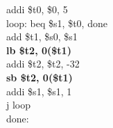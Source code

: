 \documentclass[../main.tex]{subfiles}
\begin{document}
{    \hspace*{0cm} \hspace*{0cm} \hspace*{0cm} \hspace*{0cm} \hspace*{0cm} \hspace*{0cm} \hspace*{0cm} addi \$t0, \$0, 5 \\
    loop:\hspace*{2.1mm} \hspace*{0cm}beq \$s1, \$t0, done \\
    \hspace*{0cm} \hspace*{0cm} \hspace*{0cm} \hspace*{0cm} \hspace*{0cm} \hspace*{0cm} \hspace*{0cm} add \$t1, \$s0, \$s1 \\
    \hspace*{0cm} \hspace*{0cm} \hspace*{0cm} \hspace*{0cm} \hspace*{0cm} \hspace*{0cm} \hspace*{0cm} \textbf{lb \$t2, 0(\$t1)} \\
    \hspace*{0cm} \hspace*{0cm} \hspace*{0cm} \hspace*{0cm} \hspace*{0cm} \hspace*{0cm} \hspace*{0cm} addi \$t2, \$t2, -32 \\
    \hspace*{0cm} \hspace*{0cm} \hspace*{0cm} \hspace*{0cm} \hspace*{0cm} \hspace*{0cm} \hspace*{0cm} \textbf{sb \$t2, 0(\$t1)} \\
    \hspace*{0cm} \hspace*{0cm} \hspace*{0cm} \hspace*{0cm} \hspace*{0cm} \hspace*{0cm} \hspace*{0cm} addi \$s1, \$s1, 1 \\
    \hspace*{0cm} \hspace*{0cm} \hspace*{0cm} \hspace*{0cm} \hspace*{0cm} \hspace*{0cm} \hspace*{0cm} j loop \\
    done: \\
}
\end{document}
